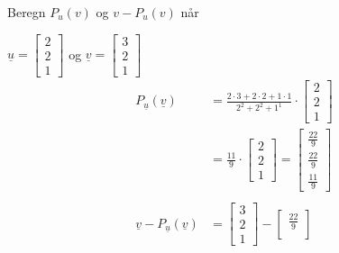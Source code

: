 \documentclass[11pt, a4paper, norsk]{NTNUoving}
\begin{document}
    \begin{oppgave}
        Beregn $P_{u}(v)$ og $v - P_{u}(v)$ når
        \begin{punkt}
            $\underline{u} = \begin{bmatrix}
                2 \\
                2 \\
                1
            \end{bmatrix}$ og $\underline{v} = \begin{bmatrix}
                3 \\
                2 \\
                1
            \end{bmatrix}$
            \begin{align*}
                P_{\underline{u}}(\underline{v}) &= \frac{2 \cdot 3 + 2 \cdot 2 + 1 \cdot 1}{2^2 + 2^2 + 1^1} \cdot \begin{bmatrix}
                    2 \\
                    2 \\
                    1
                \end{bmatrix}
                \\
                         &= \frac{11}{9} \cdot \begin{bmatrix}
                             2 \\
                             2 \\
                             1
                         \end{bmatrix} = \begin{bmatrix}
                             \frac{22}{9} \\
                             \frac{22}{9} \\
                             \frac{11}{9}
                         \end{bmatrix}
                         \\
                         \\
                    \underline{v} - P_{\underline{u}}(\underline{v}) &= \begin{bmatrix}
                        3 \\
                        2 \\
                        1
                    \end{bmatrix} - \begin{bmatrix}
                        \frac{22}{9} \\

\end{bmatrix}
\end{align*}
\end{punkt}
\end{oppgave}
\end{document}
